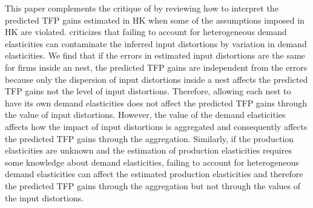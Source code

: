 \documentclass[12pt]{article}
\begin{document}
This paper complements the critique of \citet{NBERw24199} by reviewing how to interpret the predicted TFP gains estimated in HK when some of the assumptions imposed in HK are violated. \citet{NBERw24199} criticizes that failing to account for heterogeneous demand elasticities can contaminate the inferred input distortions by variation in demand elasticities. We find that if the errors in estimated input distortions are the same for firms inside an nest, the predicted TFP gains are independent from the errors because only the dispersion of input distortions inside a nest affects the predicted TFP gains not the level of input distortions. Therefore, allowing each nest to have its own demand elasticities does not affect the predicted TFP gains through the value of input distortions. However, the value of the demand elasticities affects how the impact of input distortions is aggregated and consequently affects the predicted TFP gains through the aggregation. Similarly, if the production elasticities are unknown and the estimation of production elasticities requires some knowledge about demand elasticities, failing to account for heterogeneous demand elasticities can affect the estimated production elasticities and therefore the predicted TFP gains through the aggregation but not through the values of the input distortions.



\end{document}
